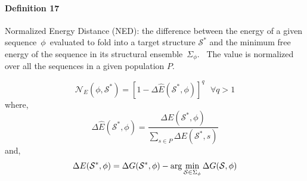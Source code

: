 \paragraph{\textbf{Definition 17} } Normalized Energy Distance (NED): the difference between
the energy of a given sequence~\(\phi\)~evaluated to fold into a target structure $\mathcal{S}^*$ and the minimum free energy of the sequence in its structural ensemble~\(\Sigma_{\phi}\).~ The value is normalized over all the sequences in a given population $P$.  


\begin{equation}
\label{ned}
\mathcal{N}_E (\phi, \mathcal{S}^*) = [1-\Delta \hat{E}(\mathcal{S}^*,\phi)]^q \text{   } \forall q>1
\end{equation}
where,
\begin{equation}
\Delta \hat{E}(\mathcal{S}^*, \phi) = \frac{\Delta E(\mathcal{S}^*, \phi) }{\sum_{s \in P}{\Delta E(\mathcal{S}^*, s)}}
\end{equation}
and,
\begin{equation}
\Delta E(\mathcal{S}^*,\phi) = \Delta G(\mathcal{S}^*, \phi) - \arg \min_{\mathcal{S} \in \Sigma_{\phi\\
}} \Delta G(\mathcal{S}, \phi)
\end{equation}






